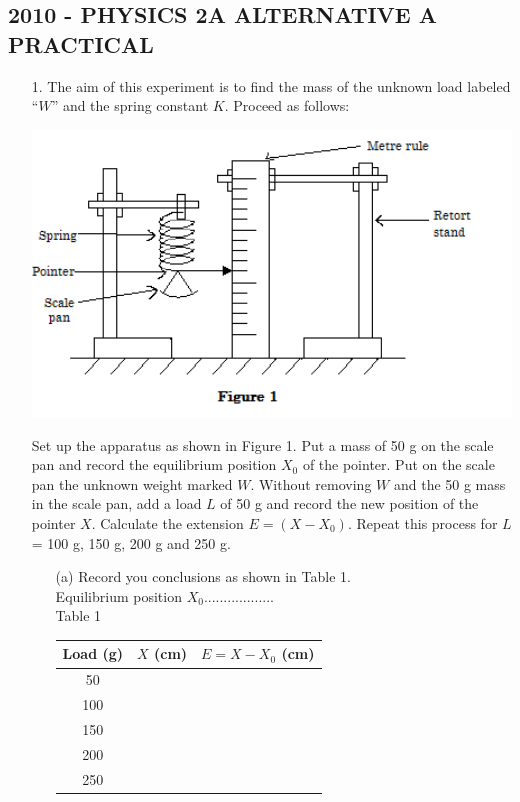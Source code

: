 \subsection{2010 - PHYSICS 2A ALTERNATIVE A PRACTICAL}

\begin{enumerate}
\item[1.] The aim of this experiment is to find the mass of the unknown load labeled ``$W$'' and the spring constant $K$. Proceed as follows:

\begin{center}
\includegraphics[width=14cm]{./img/2010-1-alt.png}
\end{center}

Set up the apparatus as shown in Figure 1. Put a mass of 50 g on the scale pan and record the equilibrium position $X_0$ of the pointer. Put on the scale pan the unknown weight marked $W$. Without removing $W$ and the 50 g mass in the scale pan, add a load $L$ of 50 g and record the new position of the pointer $X$. Calculate the extension $E = (X - X_0)$. Repeat this process for $L$ = 100 g, 150 g, 200 g and 250 g.
\begin{enumerate}
\item[(a)] Record you conclusions as shown in Table 1.\\[10pt]

Equilibrium position $X_0$..................\\[10pt]

Table 1\\[10pt]

\begin{tabular}{|p{3cm}|p{3cm}|p{3cm}|} \hline
\multicolumn{1}{|c|}{Load (g)} & \multicolumn{1}{c|}{$X$ (cm)} & \multicolumn{1}{c|}{$E = X - X_0$ (cm)} \\ \hline
\multicolumn{1}{|c|}{50} & & \\ \hline
\multicolumn{1}{|c|}{100} & & \\ \hline
\multicolumn{1}{|c|}{150} & & \\ \hline
\multicolumn{1}{|c|}{200} & & \\ \hline
\multicolumn{1}{|c|}{250} & & \\ \hline
\end{tabular}\\[10pt]


\end{enumerate}
\end{enumerate}
